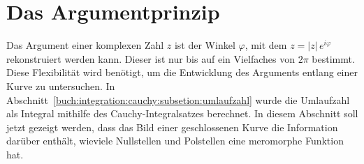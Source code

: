%
%
%
\section{Das Argumentprinzip
\label{buch:integration:section:argumentprinzip}}
Das Argument einer komplexen Zahl $z$ ist der Winkel $\varphi$,
mit dem $z=|z|\,e^{i\varphi}$ rekonstruiert werden kann.
Dieser ist nur bis auf ein Vielfaches von $2\pi$ bestimmt.
Diese Flexibilität wird benötigt, um die Entwicklung des
Arguments entlang einer Kurve zu untersuchen.
In Abschnitt~\ref{buch:integration:cauchy:subsetion:umlaufzahl}
wurde die Umlaufzahl als Integral mithilfe des Cauchy-Integralsatzes
berechnet.
In diesem Abschnitt soll jetzt gezeigt werden, dass das Bild
einer geschlossenen Kurve die Information darüber enthält, wieviele
Nullstellen und Polstellen eine meromorphe Funktion hat.




